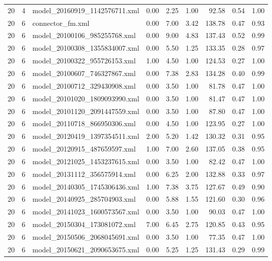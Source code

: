\begin{table}[ht]
\begin{tabular}{rrlrrrrrr}
   20 &   4 & model\_20160919\_1142576711.xml & 0.00 & 2.25 & 1.00 & 92.58 & 0.54 & 1.00 \\ 
   20 &   6 & connector\_fm.xml & 0.00 & 7.00 & 3.42 & 138.78 & 0.47 & 0.93 \\ 
   20 &   6 & model\_20100106\_985255768.xml & 0.00 & 9.00 & 4.83 & 137.43 & 0.52 & 0.99 \\ 
   20 &   6 & model\_20100308\_1355834007.xml & 0.00 & 5.50 & 1.25 & 133.35 & 0.28 & 0.97 \\ 
   20 &   6 & model\_20100322\_955726153.xml & 1.00 & 4.50 & 1.00 & 124.53 & 0.27 & 1.00 \\ 
   20 &   6 & model\_20100607\_746327867.xml & 0.00 & 7.38 & 2.83 & 134.28 & 0.40 & 0.99 \\ 
   20 &   6 & model\_20100712\_329430908.xml & 0.00 & 3.50 & 1.00 & 81.78 & 0.47 & 1.00 \\ 
   20 &   6 & model\_20101020\_1809093990.xml & 0.00 & 3.50 & 1.00 & 81.47 & 0.47 & 1.00 \\ 
   20 &   6 & model\_20101120\_2091447559.xml & 0.00 & 3.50 & 1.00 & 87.80 & 0.47 & 1.00 \\ 
   20 &   6 & model\_20110718\_866950306.xml & 0.00 & 4.50 & 1.00 & 123.95 & 0.27 & 1.00 \\ 
   20 &   6 & model\_20120419\_1397354511.xml & 2.00 & 5.20 & 1.42 & 130.32 & 0.31 & 0.95 \\ 
   20 &   6 & model\_20120915\_487659597.xml & 1.00 & 7.00 & 2.60 & 137.05 & 0.38 & 0.95 \\ 
   20 &   6 & model\_20121025\_1453237615.xml & 0.00 & 3.50 & 1.00 & 82.42 & 0.47 & 1.00 \\ 
   20 &   6 & model\_20131112\_356575914.xml & 0.00 & 6.25 & 2.00 & 132.88 & 0.33 & 0.97 \\ 
   20 &   6 & model\_20140305\_1745306436.xml & 1.00 & 7.38 & 3.75 & 127.67 & 0.49 & 0.90 \\ 
   20 &   6 & model\_20140925\_285704903.xml & 0.00 & 5.88 & 1.55 & 121.60 & 0.30 & 0.96 \\ 
   20 &   6 & model\_20141023\_1600573567.xml & 0.00 & 3.50 & 1.00 & 90.03 & 0.47 & 1.00 \\ 
   20 &   6 & model\_20150304\_173081072.xml & 7.00 & 6.45 & 2.75 & 120.85 & 0.43 & 0.95 \\ 
   20 &   6 & model\_20150506\_2068045691.xml & 0.00 & 3.50 & 1.00 & 77.35 & 0.47 & 1.00 \\ 
   20 &   6 & model\_20150621\_2090653675.xml & 0.00 & 5.25 & 1.25 & 131.43 & 0.29 & 0.99 \\ 

\end{tabular}
\end{table}
